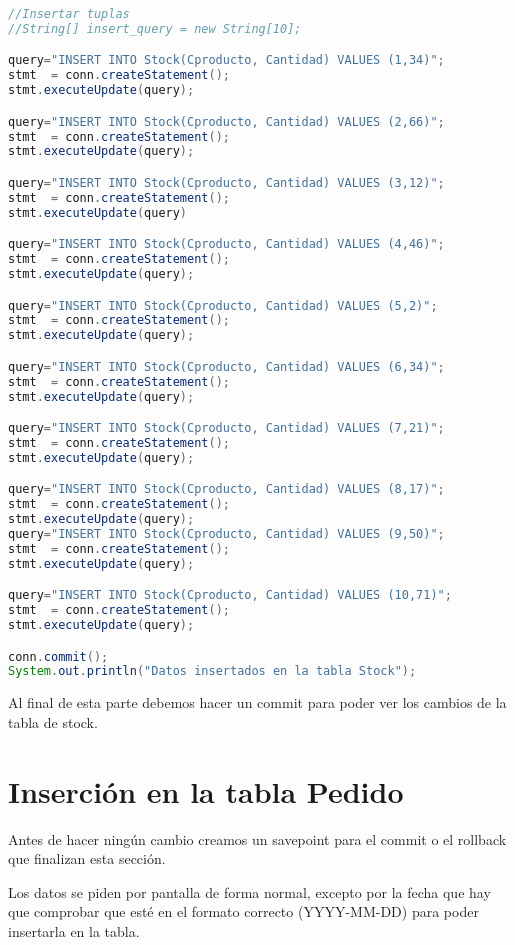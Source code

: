 \begin{lstlisting}[language=Java]
//Insertar tuplas
//String[] insert_query = new String[10];

query="INSERT INTO Stock(Cproducto, Cantidad) VALUES (1,34)";
stmt  = conn.createStatement();
stmt.executeUpdate(query);

query="INSERT INTO Stock(Cproducto, Cantidad) VALUES (2,66)";
stmt  = conn.createStatement();
stmt.executeUpdate(query);

query="INSERT INTO Stock(Cproducto, Cantidad) VALUES (3,12)";
stmt  = conn.createStatement();
stmt.executeUpdate(query)

query="INSERT INTO Stock(Cproducto, Cantidad) VALUES (4,46)";
stmt  = conn.createStatement();
stmt.executeUpdate(query);

query="INSERT INTO Stock(Cproducto, Cantidad) VALUES (5,2)";
stmt  = conn.createStatement();
stmt.executeUpdate(query);

query="INSERT INTO Stock(Cproducto, Cantidad) VALUES (6,34)";
stmt  = conn.createStatement();
stmt.executeUpdate(query);

query="INSERT INTO Stock(Cproducto, Cantidad) VALUES (7,21)";
stmt  = conn.createStatement();
stmt.executeUpdate(query);

query="INSERT INTO Stock(Cproducto, Cantidad) VALUES (8,17)";
stmt  = conn.createStatement();
stmt.executeUpdate(query);
query="INSERT INTO Stock(Cproducto, Cantidad) VALUES (9,50)";
stmt  = conn.createStatement();
stmt.executeUpdate(query);

query="INSERT INTO Stock(Cproducto, Cantidad) VALUES (10,71)";
stmt  = conn.createStatement();
stmt.executeUpdate(query);

conn.commit();
System.out.println("Datos insertados en la tabla Stock");
\end{lstlisting}

Al final de esta parte debemos hacer un commit para poder ver los cambios de la tabla de stock.

\section{Inserción en la tabla Pedido}

Antes de hacer ningún cambio creamos un savepoint para el commit o el rollback que finalizan esta sección.

Los datos se piden por pantalla de forma normal, excepto por la fecha que hay que comprobar que esté en el formato correcto (YYYY-MM-DD) para poder insertarla en la tabla.

